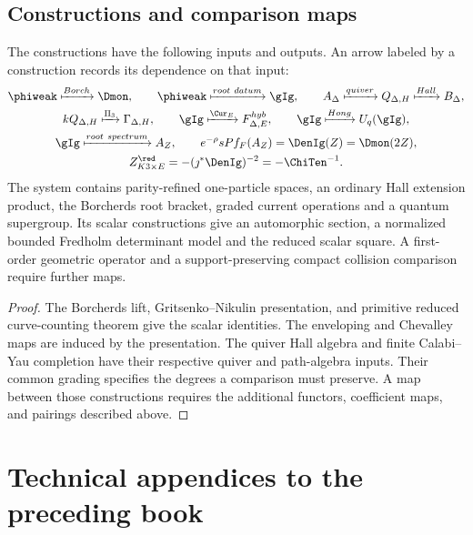 \chapter{Constructions and comparison maps}
\begin{theorem}
The constructions have the following inputs and outputs. An arrow
labeled by a construction records its dependence on that input:
\[
\begin{gathered}
 \phiweak\xmapsto{\mathrm{Borch}}\Dmon,
 \qquad
 \phiweak\xmapsto{\mathrm{root\ datum}}\gIg,
 \qquad
 A_\Delta\xmapsto{\mathrm{quiver}}Q_{\Delta,H}
 \xmapsto{\mathrm{Hall}}\mathcal B_\Delta,\\
 kQ_{\Delta,H}\xmapsto{\Pi_3}\Gamma_{\Delta,H},
 \qquad
 \gIg\xmapsto{\Cur_E}\mathcal F^{\mathrm{hyb}}_{\Delta,E},
 \qquad
 \gIg\xmapsto{\mathrm{Hong}}\widehat U_q(\gIg),\\
 \gIg\xmapsto{\mathrm{root\ spectrum}}\mathbb A_Z,
 \qquad
 e^{-\rho}\operatorname{sPf}_F(\mathbb A_Z)=\DenIg(Z)=\Dmon(2Z),\\
 \mathcal Z^{\red}_{K3\times E}=-(\jmath^*\DenIg)^{-2}=-\ChiTen^{-1}.
\end{gathered}
\]
The system contains parity-refined one-particle spaces, an ordinary Hall extension product, the Borcherds root bracket, graded current operations and a quantum supergroup. Its scalar constructions give an automorphic section, a normalized bounded Fredholm determinant model and the reduced scalar square. A first-order geometric operator and a support-preserving compact collision comparison require further maps.
\end{theorem}
\begin{proof}
The Borcherds lift, Gritsenko--Nikulin presentation, and primitive
reduced curve-counting theorem give the scalar identities. The
enveloping and Chevalley maps are induced by the presentation.
The quiver Hall algebra and finite Calabi--Yau completion have their
respective quiver and path-algebra inputs. Their common grading
specifies the degrees a comparison must preserve. A map between
those constructions requires the additional functors, coefficient
maps, and pairings described above.
\end{proof}


\part{Technical appendices to the preceding book}
